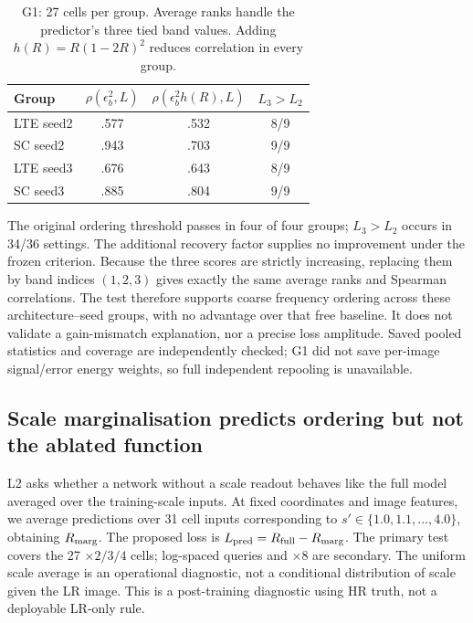 \begin{table}[t]\centering\small
\caption{G1: 27 cells per group. Average ranks handle the predictor's three tied band values. Adding $h(R)=R(1-2R)^2$ reduces correlation in every group.}\label{tab:g1-main}
\begin{tabular}{lccc}\toprule
Group & $\rho(\epsilon_b^2,L)$ & $\rho(\epsilon_b^2h(R),L)$ & $L_3>L_2$\\\midrule
LTE seed2 & .577 & .532 & 8/9\\
SC seed2 & .943 & .703 & 9/9\\
LTE seed3 & .676 & .643 & 8/9\\
SC seed3 & .885 & .804 & 9/9\\\bottomrule
\end{tabular}
\end{table}
The original ordering threshold passes in four of four groups; $L_3>L_2$ occurs in 34/36 settings. The additional recovery factor supplies no improvement under the frozen criterion. Because the three scores are strictly increasing, replacing them by band indices $(1,2,3)$ gives exactly the same average ranks and Spearman correlations. The test therefore supports coarse frequency ordering across these architecture--seed groups, with no advantage over that free baseline. It does not validate a gain-mismatch explanation, nor a precise loss amplitude. Saved pooled statistics and coverage are independently checked; G1 did not save per-image signal/error energy weights, so full independent repooling is unavailable.

\subsection{Scale marginalisation predicts ordering but not the ablated function}\label{sec:l2-main}
L2 asks whether a network without a scale readout behaves like the full model averaged over the training-scale inputs. At fixed coordinates and image features, we average predictions over 31 cell inputs corresponding to $s'\in\{1.0,1.1,\ldots,4.0\}$, obtaining $R_{\rm marg}$. The proposed loss is $L_{\rm pred}=R_{\rm full}-R_{\rm marg}$. The primary test covers the 27 $\times2/3/4$ cells; log-spaced queries and $\times8$ are secondary. The uniform scale average is an operational diagnostic, not a conditional distribution of scale given the LR image. This is a post-training diagnostic using HR truth, not a deployable LR-only rule.

